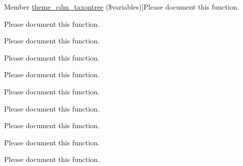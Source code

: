 \begin{DoxyRefList}
Member \hyperlink{cdm__taxontree_8module_ad0d84031fef82aceaecff9adca67ab8e}{theme\-\_\-cdm\-\_\-taxontree} (\$variables)]Please document this function.  
\item[\label{todo__todo000099}%
\hypertarget{todo__todo000099}{}%
Member \hyperlink{cdm__taxontree_8module_a965a3172ff1d3e21a8396984cff1a375}{theme\-\_\-cdm\-\_\-taxontree\-\_\-add\-\_\-scripts} ()]Please document this function.  
\item[\label{todo__todo000100}%
\hypertarget{todo__todo000100}{}%
Member \hyperlink{cdm__taxontree_8module_a1f981d74bee761838367e099b662fe97}{theme\-\_\-cdm\-\_\-taxontree\-\_\-controller} (\$variables)]Please document this function.  
\item[\label{todo__todo000102}%
\hypertarget{todo__todo000102}{}%
Member \hyperlink{cdm__taxontree_8module_a030259b362a7f75d6d6cac2d5eec376c}{theme\-\_\-cdm\-\_\-taxontree\-\_\-node} (\$variables)]Please document this function.  
\item[\label{todo__todo000103}%
\hypertarget{todo__todo000103}{}%
Member \hyperlink{cdm__taxontree_8module_adc56299a54aaca55334358ca123fec31}{theme\-\_\-cdm\-\_\-taxontree\-\_\-node\-\_\-filter\-\_\-switch} (\$variables)]Please document this function.  
\item[\label{todo__todo000178}%
\hypertarget{todo__todo000178}{}%
Member \hyperlink{cdm__dataportal_8name_8theme_a854555b925e3cff92dba7606c056ced1}{theme\-\_\-cdm\-\_\-typedesignations} (\$variables)]Please document this function.  
\item[\label{todo__todo000161}%
\hypertarget{todo__todo000161}{}%
Member \hyperlink{cdm__dataportal_8descriptions_8theme_a31b57657dc350d779a4120ae990417de}{theme\-\_\-cdm\-\_\-\-Use\-Description} (\$variables)]Please document this function.  
\item[\label{todo__todo000115}%
\hypertarget{todo__todo000115}{}%
Member \hyperlink{ext__links_8module_ab7b773677d26f78620a416d28a6e66c1}{theme\-\_\-ext\-\_\-links\-\_\-list\-\_\-grouped} (\$variables)]Please document this function.  
\item[\label{todo__todo000116}%
\hypertarget{todo__todo000116}{}%
Member \hyperlink{ext__links_8module_a47b7e1bd8d110a45c727fe476b3ea7d6}{theme\-\_\-ext\-\_\-links\-\_\-list\-\_\-plain} (\$variables)]Please document this function.  
\item[\label{todo__todo000146}%
\hypertarget{todo__todo000146}{}%
Member \hyperlink{cdm__dataportal_8descriptions_8theme_ada1fbb453b6124726bae5dc5d1911134}{theme\-\_\-\-Feature\-Tree\-\_\-hierarchy} (\$variables)]Please document this function.  

\end{DoxyRefList}
